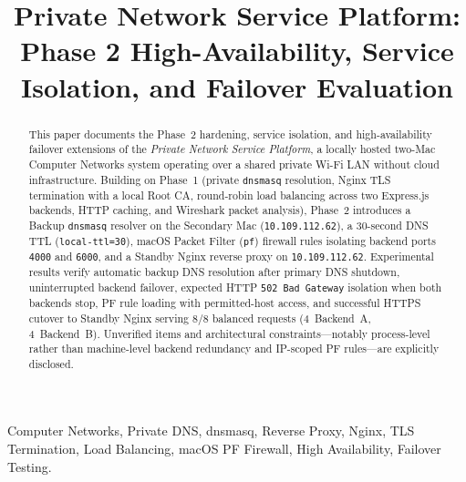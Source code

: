 \documentclass[conference]{IEEEtran}
\begin{document}
\title{Private Network Service Platform: Phase 2 High-Availability, Service Isolation, and Failover Evaluation}

\author{
}

\maketitle

\begin{abstract}
This paper documents the Phase~2 hardening, service isolation, and high-availability failover extensions of the \textit{Private Network Service Platform}, a locally hosted two-Mac Computer Networks system operating over a shared private Wi-Fi LAN without cloud infrastructure. Building on Phase~1 (private \texttt{dnsmasq} resolution, Nginx TLS termination with a local Root CA, round-robin load balancing across two Express.js backends, HTTP caching, and Wireshark packet analysis), Phase~2 introduces a Backup \texttt{dnsmasq} resolver on the Secondary Mac (\texttt{10.109.112.62}), a 30-second DNS TTL (\texttt{local-ttl=30}), macOS Packet Filter (\texttt{pf}) firewall rules isolating backend ports \texttt{4000} and \texttt{6000}, and a Standby Nginx reverse proxy on \texttt{10.109.112.62}. Experimental results verify automatic backup DNS resolution after primary DNS shutdown, uninterrupted backend failover, expected HTTP \texttt{502 Bad Gateway} isolation when both backends stop, PF rule loading with permitted-host access, and successful HTTPS cutover to Standby Nginx serving 8/8 balanced requests (4~Backend~A, 4~Backend~B). Unverified items and architectural constraints---notably process-level rather than machine-level backend redundancy and IP-scoped PF rules---are explicitly disclosed.
\end{abstract}

\begin{IEEEkeywords}
Computer Networks, Private DNS, dnsmasq, Reverse Proxy, Nginx, TLS Termination, Load Balancing, macOS PF Firewall, High Availability, Failover Testing.
\end{IEEEkeywords}
\end{document}
